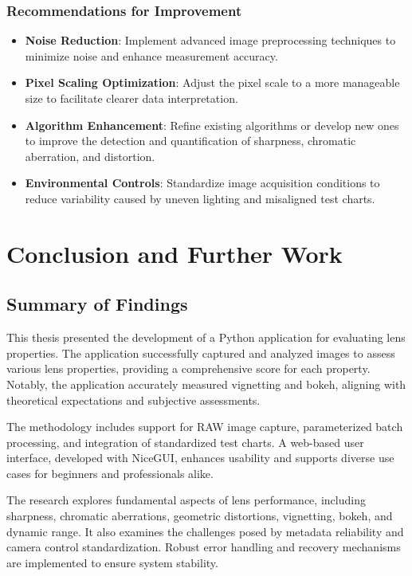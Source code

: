 \documentclass{book}
\begin{document}
\subsection{Recommendations for Improvement}
\begin{itemize}
    \item \textbf{Noise Reduction}: Implement advanced image preprocessing techniques to minimize noise and enhance measurement accuracy.
    \item \textbf{Pixel Scaling Optimization}: Adjust the pixel scale to a more manageable size to facilitate clearer data interpretation.
    \item \textbf{Algorithm Enhancement}: Refine existing algorithms or develop new ones to improve the detection and quantification of sharpness, chromatic aberration, and distortion.
    \item \textbf{Environmental Controls}: Standardize image acquisition conditions to reduce variability caused by uneven lighting and misaligned test charts.
\end{itemize}

\chapter{Conclusion and Further Work}

\section{Summary of Findings}
This thesis presented the development of a Python application for evaluating lens properties. The application successfully captured and analyzed images to assess various lens properties, providing a comprehensive score for each property. Notably, the application accurately measured vignetting and bokeh, aligning with theoretical expectations and subjective assessments.

The methodology includes support for RAW image capture, parameterized batch processing, and integration of standardized test charts. A web-based user interface, developed with NiceGUI, enhances usability and supports diverse use cases for beginners and professionals alike.

The research explores fundamental aspects of lens performance, including sharpness, chromatic aberrations, geometric distortions, vignetting, bokeh, and dynamic range. It also examines the challenges posed by metadata reliability and camera control standardization. Robust error handling and recovery mechanisms are implemented to ensure system stability.
\end{document}
